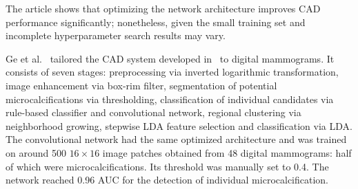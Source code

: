 The article shows that optimizing the network architecture improves CAD performance significantly; nonetheless, given the small training set and incomplete hyperparameter search results may vary. 





\begin{comment}
- Like Gurcan2002 but slightly changed for digital mammography
- six stages
- trained on manually sleected miucrocalcifications and some selected by the CAD which were not  microcalcifications
- threshold chosen by training as 0.4 to remove signals with low CNN scores
\end{comment}
Ge et al.~\cite{Ge2006} tailored the CAD system developed in~\cite{Gurcan2002} to digital mammograms.
It consists of seven stages: preprocessing via inverted logarithmic transformation, image enhancement via box-rim filter, segmentation of potential microcalcifications via thresholding, classification of individual candidates via rule-based classifier and convolutional network, regional clustering via neighborhood growing, stepwise LDA feature selection and classification via LDA. The convolutional network had the same optimized architecture and was trained on around 500 $16 \times 16$ image patches obtained from 48 digital mammograms: half of which were microcalcifications. Its threshold was manually set to 0.4. The network reached 0.96 AUC for the detection of individual microcalcification. 

